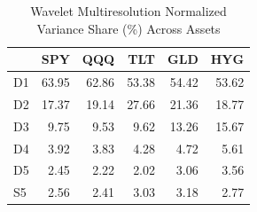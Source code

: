 \begin{table}[htbp]
\caption{Wavelet Multiresolution Normalized Variance Share (\%) Across Assets}
\label{tab:variance_decomposition}
\begin{tabular}{lrrrrr}
\toprule
 & SPY & QQQ & TLT & GLD & HYG \\
\midrule
D1 & 63.95 & 62.86 & 53.38 & 54.42 & 53.62 \\
D2 & 17.37 & 19.14 & 27.66 & 21.36 & 18.77 \\
D3 & 9.75 & 9.53 & 9.62 & 13.26 & 15.67 \\
D4 & 3.92 & 3.83 & 4.28 & 4.72 & 5.61 \\
D5 & 2.45 & 2.22 & 2.02 & 3.06 & 3.56 \\
S5 & 2.56 & 2.41 & 3.03 & 3.18 & 2.77 \\
\bottomrule
\end{tabular}
\end{table}
